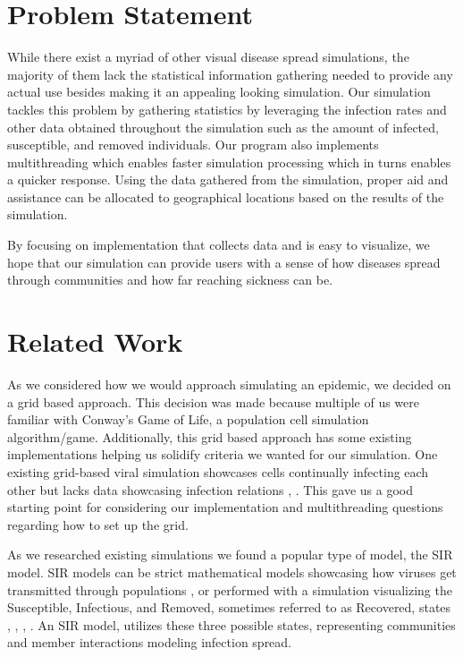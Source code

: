 \documentclass[conference]{IEEEtran}
\begin{document}
\section{Problem Statement}


While there exist a myriad of other visual disease spread simulations, the majority of them lack the statistical information gathering needed to provide any actual use besides making it an appealing looking simulation. Our simulation tackles this problem by gathering statistics by leveraging the infection rates and other data obtained throughout the simulation such as the amount of infected, susceptible, and removed individuals. Our program also implements multithreading which enables faster simulation processing which in turns enables a quicker response. Using the data gathered from the simulation, proper aid and assistance can be allocated to geographical locations based on the results of the simulation. 

By focusing on implementation that collects data and is easy to visualize, we hope that our simulation can provide users with a sense of how diseases spread through communities and how far reaching sickness can be.


\section{Related Work}

As we considered how we would approach simulating an epidemic, we decided on a grid based approach. This decision was made because multiple of us were familiar with Conway's Game of Life, a population cell simulation algorithm/game. Additionally, this grid based approach has some existing implementations helping us solidify criteria we wanted for our simulation. One existing grid-based viral simulation showcases cells continually infecting each other but lacks data showcasing infection relations \cite{b1}, \cite{b2}. This gave us a good starting point for considering our implementation and multithreading questions regarding how to set up the grid. 

As we researched existing simulations we found a popular type of model, the SIR model. SIR models can be strict mathematical models showcasing how viruses get transmitted through populations \cite{b3}, or performed with a simulation visualizing the Susceptible, Infectious, and Removed, sometimes referred to as Recovered, states \cite{b4}, \cite{b5}, \cite{b6}, \cite{b8}.  An SIR model, utilizes these three possible states, representing communities and member interactions modeling infection spread. 
\end{document}
